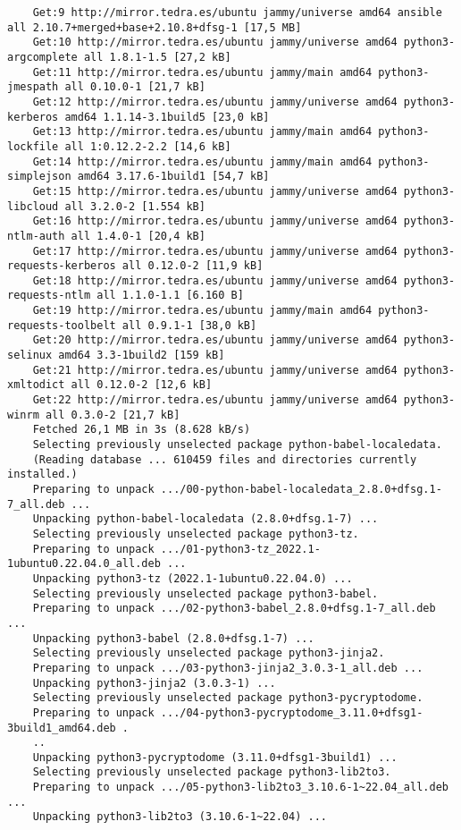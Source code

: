 \documentclass[../main.tex]{subfiles}
\begin{document}
\begin{lstlisting}
	Get:9 http://mirror.tedra.es/ubuntu jammy/universe amd64 ansible all 2.10.7+merged+base+2.10.8+dfsg-1 [17,5 MB]
	Get:10 http://mirror.tedra.es/ubuntu jammy/universe amd64 python3-argcomplete all 1.8.1-1.5 [27,2 kB]
	Get:11 http://mirror.tedra.es/ubuntu jammy/main amd64 python3-jmespath all 0.10.0-1 [21,7 kB]
	Get:12 http://mirror.tedra.es/ubuntu jammy/universe amd64 python3-kerberos amd64 1.1.14-3.1build5 [23,0 kB]
	Get:13 http://mirror.tedra.es/ubuntu jammy/main amd64 python3-lockfile all 1:0.12.2-2.2 [14,6 kB]
	Get:14 http://mirror.tedra.es/ubuntu jammy/main amd64 python3-simplejson amd64 3.17.6-1build1 [54,7 kB]
	Get:15 http://mirror.tedra.es/ubuntu jammy/universe amd64 python3-libcloud all 3.2.0-2 [1.554 kB]
	Get:16 http://mirror.tedra.es/ubuntu jammy/universe amd64 python3-ntlm-auth all 1.4.0-1 [20,4 kB]
	Get:17 http://mirror.tedra.es/ubuntu jammy/universe amd64 python3-requests-kerberos all 0.12.0-2 [11,9 kB]
	Get:18 http://mirror.tedra.es/ubuntu jammy/universe amd64 python3-requests-ntlm all 1.1.0-1.1 [6.160 B]
	Get:19 http://mirror.tedra.es/ubuntu jammy/main amd64 python3-requests-toolbelt all 0.9.1-1 [38,0 kB]
	Get:20 http://mirror.tedra.es/ubuntu jammy/universe amd64 python3-selinux amd64 3.3-1build2 [159 kB]
	Get:21 http://mirror.tedra.es/ubuntu jammy/universe amd64 python3-xmltodict all 0.12.0-2 [12,6 kB]
	Get:22 http://mirror.tedra.es/ubuntu jammy/universe amd64 python3-winrm all 0.3.0-2 [21,7 kB]
	Fetched 26,1 MB in 3s (8.628 kB/s)   
	Selecting previously unselected package python-babel-localedata.
	(Reading database ... 610459 files and directories currently installed.)
	Preparing to unpack .../00-python-babel-localedata_2.8.0+dfsg.1-7_all.deb ...
	Unpacking python-babel-localedata (2.8.0+dfsg.1-7) ...
	Selecting previously unselected package python3-tz.
	Preparing to unpack .../01-python3-tz_2022.1-1ubuntu0.22.04.0_all.deb ...
	Unpacking python3-tz (2022.1-1ubuntu0.22.04.0) ...
	Selecting previously unselected package python3-babel.
	Preparing to unpack .../02-python3-babel_2.8.0+dfsg.1-7_all.deb ...
	Unpacking python3-babel (2.8.0+dfsg.1-7) ...
	Selecting previously unselected package python3-jinja2.
	Preparing to unpack .../03-python3-jinja2_3.0.3-1_all.deb ...
	Unpacking python3-jinja2 (3.0.3-1) ...
	Selecting previously unselected package python3-pycryptodome.
	Preparing to unpack .../04-python3-pycryptodome_3.11.0+dfsg1-3build1_amd64.deb .
	..
	Unpacking python3-pycryptodome (3.11.0+dfsg1-3build1) ...
	Selecting previously unselected package python3-lib2to3.
	Preparing to unpack .../05-python3-lib2to3_3.10.6-1~22.04_all.deb ...
	Unpacking python3-lib2to3 (3.10.6-1~22.04) ...

\end{lstlisting}
\end{document}
